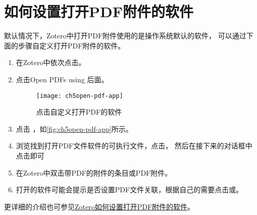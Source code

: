 \documentclass[cn,11pt,chinese]{elegantbook}
\begin{document}
		\section{如何设置打开PDF附件的软件}\label{sec:open_PDF}
			默认情况下，Zotero中打开PDF附件使用的是操作系统默认的软件，
			可以通过下面的步骤自定义打开PDF附件的软件。
			\begin{enumerate}
				\item 在Zotero中依次点击。
				\item 点击Open PDFs using 后面。
				
					\begin{figure}[ht]
						\centering
						\texttt{[image: ch5open-pdf-app]}
						\caption{点击自定义打开PDF的软件}
						\label{fig:ch5open-pdf-app}
					\end{figure}
				\item 点击 ，如\autoref{fig:ch5open-pdf-app}所示。
				\item 浏览找到打开PDF文件软件的可执行文件，点击，
				然后在接下来的对话框中点击即可
				\item 在Zotero中双击带PDF的附件的条目或PDF附件。
				\item 打开的软件可能会提示是否设置PDF文件关联，根据自己的需要点击或。
			\end{enumerate}
				更详细的介绍也可参见\href{https://zhuanlan.zhihu.com/p/373952017}
				{Zotero如何设置打开PDF附件的软件}。
\end{document}
